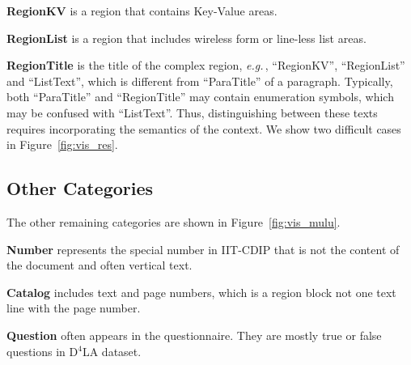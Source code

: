 \documentclass[10pt,twocolumn,letterpaper]{article}
\def\eg{\emph{e.g.}\,}
\begin{document}
\noindent
\textbf{RegionKV} is a region that contains Key-Value areas.

\noindent
\textbf{RegionList} is a region that includes wireless form or line-less list areas.

\noindent
\textbf{RegionTitle} is the title of the complex region, \eg, ``RegionKV'', ``RegionList'' and ``ListText'',
which is different from ``ParaTitle'' of a paragraph.
Typically, both ``ParaTitle'' and ``RegionTitle'' may contain enumeration symbols, which may be confused with ``ListText''.
Thus, distinguishing between these texts requires incorporating the semantics of the context.
We show two difficult cases in Figure~\ref{fig:vis_res}.

\subsection{Other Categories} 
The other remaining categories are shown in Figure~\ref{fig:vis_mulu}.

\noindent
\textbf{Number} represents the special number in IIT-CDIP that is not the content of the document and often vertical text.

\noindent
\textbf{Catalog} includes text and page numbers, which is a region block not one text line with the page number.

\noindent
\textbf{Question} often appears in the questionnaire. They are mostly true or false questions in D$^4$LA dataset.
\end{document}
